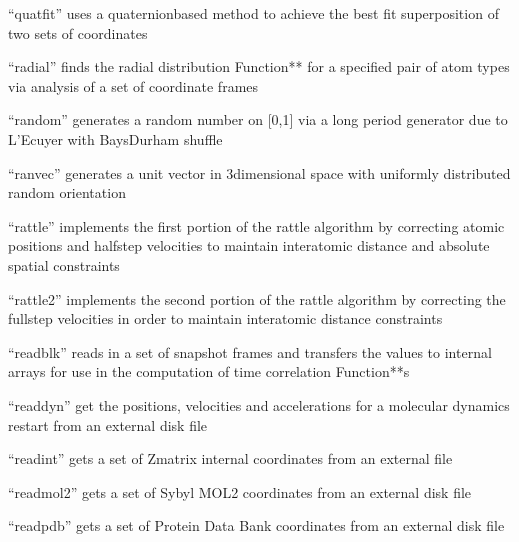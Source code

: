\documentclass[letterpaper,11pt,english]{sphinxmanual}
\begin{document}
“quatfit” uses a quaternion\sphinxhyphen{}based method to achieve the best fit superposition of two sets of coordinates


“radial” finds the radial distribution Function** for a specified pair of atom types via analysis of a set of coordinate frames


“random” generates a random number on {[}0,1{]} via a long period generator due to L’Ecuyer with Bays\sphinxhyphen{}Durham shuffle


“ranvec” generates a unit vector in 3\sphinxhyphen{}dimensional space with uniformly distributed random orientation


“rattle” implements the first portion of the rattle algorithm by correcting atomic positions and half\sphinxhyphen{}step velocities to maintain interatomic distance and absolute spatial constraints


“rattle2” implements the second portion of the rattle algorithm by correcting the full\sphinxhyphen{}step velocities in order to maintain interatomic distance constraints


“readblk” reads in a set of snapshot frames and transfers the values to internal arrays for use in the computation of time correlation Function**s


“readdyn” get the positions, velocities and accelerations for a molecular dynamics restart from an external disk file


“readint” gets a set of Z\sphinxhyphen{}matrix internal coordinates from an external file


“readmol2” gets a set of Sybyl MOL2 coordinates from an external disk file


“readpdb” gets a set of Protein Data Bank coordinates from an external disk file
\end{document}
